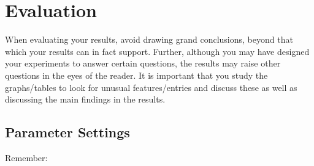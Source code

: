 \section{Evaluation}

When evaluating your results, avoid drawing grand conclusions, beyond that which your results can in fact support. Further, although you may have designed your experiments to answer certain questions, the results may raise other questions in the eyes of the reader. It is important that you study the graphs/tables to look for unusual features/entries and discuss these as well as discussing the main findings in the results. 

\subsection{Parameter Settings}
Remember:

